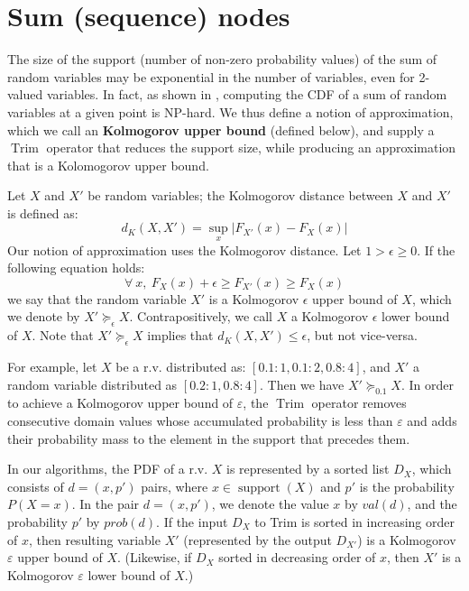 \documentclass{article}
\DeclareMathOperator{\support}{support}
\DeclareMathOperator{\Trim}{Trim}
\begin{document}
 
\section{Sum (sequence) nodes}\label{sec:seq}

The size of the support (number of non-zero probability values) of the sum of random variables
may be exponential in the number of variables, even for 2-valued variables.
In fact, as shown in \cite{}, computing the CDF of a sum of random variables at a given point is NP-hard.
We thus define a notion of approximation, 
which we call an {\bf Kolmogorov upper bound} (defined below),
and supply a $\Trim$ operator that reduces the support size, while 
producing an approximation that is a Kolomogorov upper bound.

Let $X$ and $X'$ be random variables; 
the Kolmogorov distance \cite{} between $X$ and $X'$ is defined as:
\[
d_K(X,X') = \sup_{x} |F_{X'}(x)-F_X(x)|
\]
Our notion of approximation uses the Kolmogorov distance. Let $1 > \epsilon \geq 0$.
If the following equation holds:
\[
\forall ~ x, ~ F_X(x)+\epsilon \geq F_{X'}(x) \geq F_X(x)
\]
we say that the random variable $X'$ is a Kolmogorov $\epsilon$ upper bound of $X$,
which we denote by $X' \succeq_\epsilon X$. Contrapositively, we call $X$ a  Kolmogorov $\epsilon$ lower
bound of $X$. Note that $X' \succeq_\epsilon X$ implies that $d_K(X,X') \leq \epsilon$,
but not vice-versa.

For example, let $X$ be a r.v. distributed as: $[0.1:1, 0.1:2, 0.8:4]$, and $X'$
a random variable distributed as $[0.2:1, 0.8:4]$. Then we have
$X' \succeq_{0.1} X$. In order to achieve a Kolmogorov upper bound of $\varepsilon $,
the $\Trim$ operator removes  consecutive domain values whose accumulated probability is
less than $\varepsilon$ and adds 
their probability mass to the element in the support that precedes them.

In our  algorithms, the PDF of a r.v. $X$ is represented by a sorted list $D_X$, 
which consists of $d=(x, p')$ pairs, where $x\in \support(X)$
and $p'$ is the probability $P(X{=}x)$. In the pair $d=(x, p')$, we denote the value $x$
by $val(d)$, and the probability $p'$ by $prob(d)$.
If the input $D_X$ to Trim is sorted in increasing order of $x$,
then resulting variable $X'$ (represented by the output $D_{X'}$) 
is a Kolmogorov $\varepsilon$ upper bound of $X$.
(Likewise, if $D_X$ sorted in decreasing order of $x$,
then $X'$ is a Kolmogorov $\varepsilon$ lower bound of $X$.)
\end{document}
